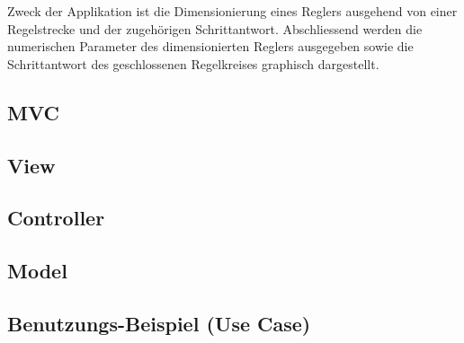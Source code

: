 
Zweck  der Applikation  ist die  Dimensionierung eines  Reglers ausgehend  von
einer Regelstrecke und  der zugeh\"origen Schrittantwort. Abschliessend werden
die  numerischen Parameter  des dimensionierten  Reglers ausgegeben  sowie die
Schrittantwort des geschlossenen Regelkreises graphisch dargestellt.


\subsection{MVC}
\label{subs:mvc}


\subsection{View}
\label{subs:view}



\subsection{Controller}



\subsection{Model}


\clearpage
\subsection{Benutzungs-Beispiel (Use Case)}

